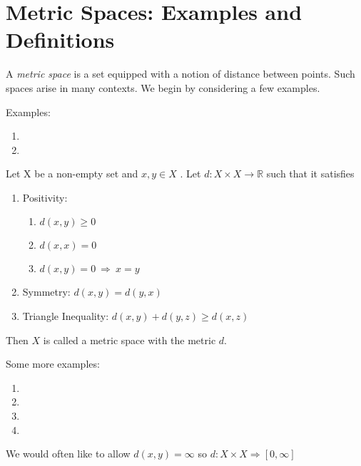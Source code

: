 \section{Metric Spaces: Examples and Definitions}

A \emph{metric space} is a set equipped with a notion of distance between points. Such
spaces arise in many contexts. We begin by considering a few examples.

\vspace{0.2in}
\noindent Examples:

\begin{enumerate}
\item
\item
\end{enumerate}

\begin{defn}

Let X be a non-empty set and $x, y \in X$ . Let $d: X\times X \rightarrow \mathbb{R}$
such that it satisfies

\begin{enumerate}
    \item Positivity:
    \begin{enumerate}
        \item $d(x,y) \geq 0$
        \item $d(x,x) = 0$
        \item $d(x,y) = 0 \ \Rightarrow\ x = y$
    \end{enumerate}
    \item Symmetry:  $d(x,y) = d(y, x)$
    \item Triangle Inequality: $d(x,y)+d(y,z) \geq d(x,z)$

\end{enumerate}

\noindent Then $X$ is called a metric space with the metric $d$.

\end{defn}

\vspace{0.1in}

\noindent Some more examples:

\begin{enumerate}
\item
\item
\item
\item
\end{enumerate}

\begin{rmk}
    We would often like to allow $d(x,y)=\infty$ so $d:X\times X \Rightarrow [0, \infty]$
\end{rmk}

